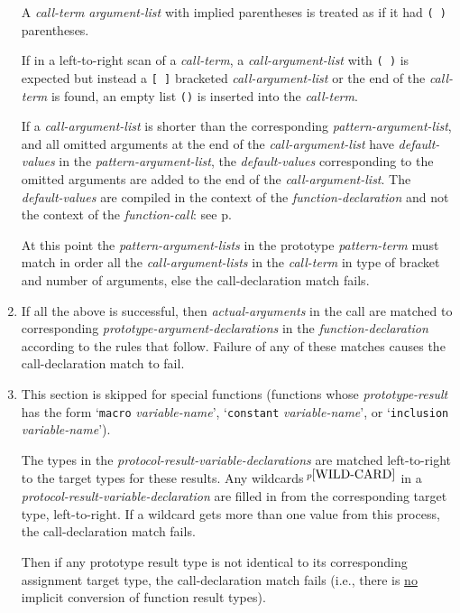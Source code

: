 \documentclass[12pt]{article}
\newcommand{\pagref}[1]{p\pageref{#1}}
\newcommand{\pagnote}[1]{$\,^{p\pageref{#1}}$}
\begin{document}
\begin{enumerate}
A {\em call-term} {\em argument-list} with implied parentheses
is treated as if it had {\tt (~)} parentheses.

If in a left-to-right scan of a {\em call-term},
a {\em call-argument-list} with {\tt (~)} is expected but instead
a {\tt [~]} bracketed {\em call-argument-list} or
the end of the {\em call-term} is found,
an empty list {\tt ()} is inserted into the {\em call-term}.

If a {\em call-argument-list} is shorter than the
corresponding {\em pattern-argument-list}, and all omitted
arguments at the end of the {\em call-argument-list} have {\em default-values}
in the {\em pattern-argument-list}, the {\em default-values} corresponding
to the omitted arguments are added to
the end of the {\em call-argument-list}.
The {\em default-values} are compiled in the context of the
{\em function-declaration} and not the context of the {\em function-call}:
see \pagref{DEFAULT-CONTEXT}.

At this point the {\em pattern-argument-lists} in the prototype
{\em pattern-term} must match in order all the {\em call-argument-lists}
in the {\em call-term} in type of bracket and number
of arguments, else the call-declaration match fails.

\item If all the above is successful, then {\em actual-arguments}
in the call are matched to corresponding {\em prototype-argument-declarations}
in the {\em function-declaration} according to the rules that follow.
Failure of any of these matches causes
the call-declaration match to fail.

\item\label{CALL-DECLARATION-TARGET-MATCHING}
This section is skipped for special functions (functions whose
{\em prototype-result} has the form `{\tt macro} {\em variable-name}',
`{\tt constant} {\em variable-name}', or
`{\tt inclusion} {\em variable-name}').

The types in the {\em protocol-result-variable-declarations} are
matched left-to-right to the target types for these results.
Any wildcards\pagnote{WILD-CARD} in a
{\em protocol-result-variable-declaration}
are filled in from the corresponding target type, left-to-right.
If a wildcard gets more
than one value from this process, the call-declaration match fails.

Then if any prototype result type is not identical to its corresponding
assignment target type, the call-declaration match fails
(i.e., there is \underline{no} implicit conversion of function result
types).


\end{enumerate}
\end{document}
